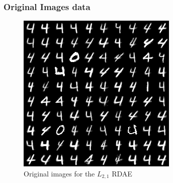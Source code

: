 \documentclass{beamer}
\theoremstyle{plain}
\theoremstyle{definition}
\theoremstyle{remark}
\begin{document}
\begin{frame}
	\frametitle{Original Images data}
	\begin{figure}
		\centering
		\includegraphics[width=0.5\linewidth]{Images/original_l21.png}
		\caption[]{Original images for the $L_{2,1}$ RDAE}
	\end{figure}
\end{frame}
\end{document}
